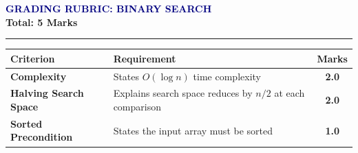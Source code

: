 \documentclass[11pt,a4paper]{article}
\begin{document}
\begin{center}
    {\large\bfseries\textcolor{navy}{GRADING RUBRIC: BINARY SEARCH}}\\[0.1cm]
    {\normalsize\textbf{Total: 5 Marks}}
\end{center}
\hrule
\vspace{0.6cm}
\begin{table}[h]
\centering
\begin{tabular}{p{4cm} p{8cm} c}
\toprule
\textbf{Criterion} & \textbf{Requirement} & \textbf{Marks} \\
\midrule
\textbf{Complexity} & States $O(\log n)$ time complexity & \textbf{2.0} \\[0.3cm]
\textbf{Halving Search Space} & Explains search space reduces by $n/2$ at each comparison & \textbf{2.0} \\[0.3cm]
\textbf{Sorted Precondition} & States the input array must be sorted & \textbf{1.0} \\
\bottomrule
\end{tabular}
\end{table}
\end{document}

